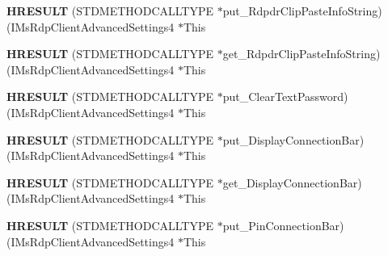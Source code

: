 \begin{DoxyCompactItemize}
\item 
\mbox{\label{struct_i_ms_rdp_client_advanced_settings4_vtbl_a3957eeaedae5dbe0d6e47c2dea0d2505}} 
{\bfseries H\+R\+E\+S\+U\+LT} (S\+T\+D\+M\+E\+T\+H\+O\+D\+C\+A\+L\+L\+T\+Y\+PE $\ast$put\+\_\+\+Rdpdr\+Clip\+Paste\+Info\+String)(I\+Ms\+Rdp\+Client\+Advanced\+Settings4 $\ast$This
\item 
\mbox{\label{struct_i_ms_rdp_client_advanced_settings4_vtbl_a2dd40fc515ac5fa15dbd18c38eaf37f9}} 
{\bfseries H\+R\+E\+S\+U\+LT} (S\+T\+D\+M\+E\+T\+H\+O\+D\+C\+A\+L\+L\+T\+Y\+PE $\ast$get\+\_\+\+Rdpdr\+Clip\+Paste\+Info\+String)(I\+Ms\+Rdp\+Client\+Advanced\+Settings4 $\ast$This
\item 
\mbox{\label{struct_i_ms_rdp_client_advanced_settings4_vtbl_a5a074f910d9b0f919589f71190b49709}} 
{\bfseries H\+R\+E\+S\+U\+LT} (S\+T\+D\+M\+E\+T\+H\+O\+D\+C\+A\+L\+L\+T\+Y\+PE $\ast$put\+\_\+\+Clear\+Text\+Password)(I\+Ms\+Rdp\+Client\+Advanced\+Settings4 $\ast$This
\item 
\mbox{\label{struct_i_ms_rdp_client_advanced_settings4_vtbl_ac4128cd2debf988fbe5527dda81b527f}} 
{\bfseries H\+R\+E\+S\+U\+LT} (S\+T\+D\+M\+E\+T\+H\+O\+D\+C\+A\+L\+L\+T\+Y\+PE $\ast$put\+\_\+\+Display\+Connection\+Bar)(I\+Ms\+Rdp\+Client\+Advanced\+Settings4 $\ast$This
\item 
\mbox{\label{struct_i_ms_rdp_client_advanced_settings4_vtbl_aeaa5b3230c42a0941f12aa4e36205482}} 
{\bfseries H\+R\+E\+S\+U\+LT} (S\+T\+D\+M\+E\+T\+H\+O\+D\+C\+A\+L\+L\+T\+Y\+PE $\ast$get\+\_\+\+Display\+Connection\+Bar)(I\+Ms\+Rdp\+Client\+Advanced\+Settings4 $\ast$This
\item 
\mbox{\label{struct_i_ms_rdp_client_advanced_settings4_vtbl_a5fef0638bddee34d4df1ca14dbd55df6}} 
{\bfseries H\+R\+E\+S\+U\+LT} (S\+T\+D\+M\+E\+T\+H\+O\+D\+C\+A\+L\+L\+T\+Y\+PE $\ast$put\+\_\+\+Pin\+Connection\+Bar)(I\+Ms\+Rdp\+Client\+Advanced\+Settings4 $\ast$This
\item 
\mbox{\label{struct_i_ms_rdp_client_advanced_settings4_vtbl_a145fc0f09b9ed5a815e6a5ec3a9c7b2e}} 

\end{DoxyCompactItemize}
